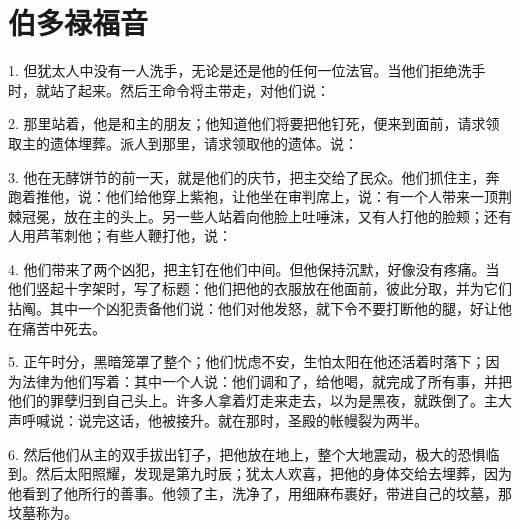 
\chapter{伯多禄福音}


1. 但犹太人中没有一人洗手，无论是还是他的任何一位法官。当他们拒绝洗手时，就站了起来。然后王命令将主带走，对他们说：\par

2. 那里站着，他是和主的朋友；他知道他们将要把他钉死，便来到面前，请求领取主的遗体埋葬。派人到那里，请求领取他的遗体。说：\par

3. 他在无酵饼节的前一天，就是他们的庆节，把主交给了民众。他们抓住主，奔跑着推他，说：他们给他穿上紫袍，让他坐在审判席上，说：有一个人带来一顶荆棘冠冕，放在主的头上。另一些人站着向他脸上吐唾沫，又有人打他的脸颊；还有人用芦苇刺他；有些人鞭打他，说：\par

4. 他们带来了两个凶犯，把主钉在他们中间。但他保持沉默，好像没有疼痛。当他们竖起十字架时，写了标题：他们把他的衣服放在他面前，彼此分取，并为它们拈阄。其中一个凶犯责备他们说：他们对他发怒，就下令不要打断他的腿，好让他在痛苦中死去。\par

5. 正午时分，黑暗笼罩了整个；他们忧虑不安，生怕太阳在他还活着时落下；因为法律为他们写着：其中一个人说：他们调和了，给他喝，就完成了所有事，并把他们的罪孽归到自己头上。许多人拿着灯走来走去，以为是黑夜，就跌倒了。主大声呼喊说：说完这话，他被接升。就在那时，圣殿的帐幔裂为两半。\par

6. 然后他们从主的双手拔出钉子，把他放在地上，整个大地震动，极大的恐惧临到。然后太阳照耀，发现是第九时辰；犹太人欢喜，把他的身体交给去埋葬，因为他看到了他所行的善事。他领了主，洗净了，用细麻布裹好，带进自己的坟墓，那坟墓称为。\par

